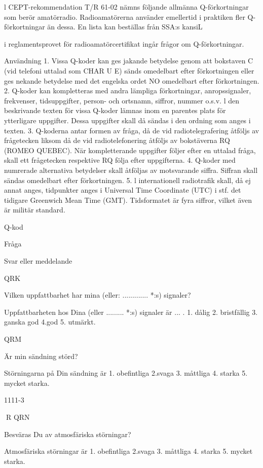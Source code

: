 l CEPT-rekommendation T/R 61-02
nämns följande allmänna Q-förkortningar
som berör amatörradio.
Radioamatörerna använder emellertid i praktiken fler Q-förkortningar än
dessa. En lista kan beställas från SSA:s
kansiL

i reglamentsprovet för radioamatörcertifikat ingår frågor om Q-förkortningar.

Användning
1. Vissa Q-koder kan ges jakande betydelse
genom att bokstaven C (vid telefoni uttalad som CHAR U E) sänds omedelbart
efter förkortningen eller ges nekande betydelse med det engelska ordet NO omedelbart efter förkortningen.
2. Q-koder kan kompletteras med andra
lämpliga förkortningar, anropssignaler,
frekvenser, tidsuppgifter, person- och
ortsnamn, siffror, nummer o.s.v. l den beskrivande texten för vissa Q-koder lämnas inom en parentes plats för ytterligare
uppgifter. Dessa uppgifter skall då sändas i den ordning som anges i texten.
3. Q-koderna antar formen av fråga, då de
vid radiotelegrafering åtföljs av frågetecken liksom då de vid radiotelefonering
åtföljs av bokstäverna RQ (ROMEO
QUEBEC). När kompletterande uppgifter följer efter en uttalad fråga, skall ett
frågetecken respektive RQ följa efter
uppgifterna.
4. Q-koder med numrerade alternativa betydelser skall åtföljas av motsvarande
siffra. Siffran skall sändas omedelbart
efter förkortningen.
5. l internationell radiotrafik skall, då ej annat anges, tidpunkter anges i Universal
Time Coordinate (UTC) i stf. det tidigare
Greenwich Mean Time (GMT). Tidsformatet är fyra siffror, vilket även är militär
standard.

Q-kod

Fråga

Svar eller meddelande

QRK

Vilken uppfattbarhet har mina
(eller: ............. *:s) signaler?

Uppfattbarheten hos Dina
(eller ......... *:s) signaler är ... .
1. dålig
2. bristfällig
3. ganska god
4.god
5. utmärkt.

QRM

Är min sändning störd?

Störningarna på Din sändning är
1. obefintliga
2.svaga
3. måttliga
4. starka
5. mycket starka.

1111-3

R
QRN

Besväras Du av atmosfäriska
störningar?

Atmosfäriska störningar är
1. obefintliga
2.svaga
3. måttliga
4. starka
5. mycket starka.

